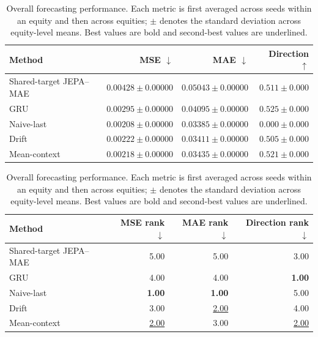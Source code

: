 \begin{table}[t]
\centering
\small
\caption{Overall forecasting performance. Each metric is first averaged across seeds within an equity and then across equities; $\pm$ denotes the standard deviation across equity-level means. Best values are bold and second-best values are underlined.}
\label{tab:main_metrics}
\begin{tabular}{lrrr}
\toprule
Method & MSE $\downarrow$ & MAE $\downarrow$ & Direction $\uparrow$ \\
\midrule
Shared-target JEPA--MAE & $0.00428 \pm 0.00000$ & $0.05043 \pm 0.00000$ & $0.511 \pm 0.000$ \\
GRU & $0.00295 \pm 0.00000$ & $0.04095 \pm 0.00000$ & \textbf{$0.525 \pm 0.000$} \\
Naive-last & \textbf{$0.00208 \pm 0.00000$} & \textbf{$0.03385 \pm 0.00000$} & $0.000 \pm 0.000$ \\
Drift & $0.00222 \pm 0.00000$ & \underline{$0.03411 \pm 0.00000$} & $0.505 \pm 0.000$ \\
Mean-context & \underline{$0.00218 \pm 0.00000$} & $0.03435 \pm 0.00000$ & \underline{$0.521 \pm 0.000$} \\
\bottomrule
\end{tabular}
\par\medskip
\begin{tabular}{lrrr}
\toprule
Method & MSE rank $\downarrow$ & MAE rank $\downarrow$ & Direction rank $\downarrow$ \\
\midrule
Shared-target JEPA--MAE & 5.00 & 5.00 & 3.00 \\
GRU & 4.00 & 4.00 & \textbf{1.00} \\
Naive-last & \textbf{1.00} & \textbf{1.00} & 5.00 \\
Drift & 3.00 & \underline{2.00} & 4.00 \\
Mean-context & \underline{2.00} & 3.00 & \underline{2.00} \\
\bottomrule
\end{tabular}
\end{table}
